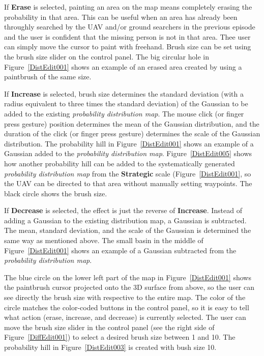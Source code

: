 If \textbf{Erase} is selected, painting an area on the map means completely erasing the probability in that area. This can be useful when an area has already been throughly searched by the UAV and/or ground searchers in the previous episode and the user is confident that the missing person is not in that area. Thee user can simply move the cursor to paint with freehand. Brush size can be set using the brush size slider on the control panel. The big circular hole in Figure~\ref{DistEdit001} shows an example of an erased area created by using a paintbrush of the same size.

If \textbf{Increase} is selected, brush size determines the standard deviation (with a radius equivalent to three times the standard deviation) of the Gaussian to be added to the existing \textit{probability distribution map}. The mouse click (or finger press gesture) position determines the mean of the Gaussian distribution, and the duration of the click (or finger press gesture) determines the scale of the Gaussian distribution. The probability hill in Figure~\ref{DistEdit001} shows an example of a Gaussian added to the \textit{probability distribution map}. Figure~\ref{DistEdit005} shows how another probability hill can be added to the systematically generated \textit{probability distribution map} from the \textbf{Strategic} scale (Figure~\ref{DistEdit001}, so the UAV can be directed to that area without manually setting waypoints. The black circle shows the brush size.

If \textbf{Decrease} is selected, the effect is just the reverse of \textbf{Increase}. Instead of adding a Gaussian to the existing distribution map, a Gaussian is subtracted. The mean, standard deviation, and the scale of the Gaussian is determined the same way as mentioned above. The small basin in the middle of Figure~\ref{DistEdit001} shows an example of a Gaussian subtracted from the \textit{probability distribution map}.

The blue circle on the lower left part of the map in Figure~\ref{DistEdit001} shows the paintbrush cursor projected onto the 3D surface from above, so the user can see directly the brush size with respective to the entire map. The color of the circle matches the color-coded buttons in the control panel, so it is easy to tell what action (erase, increase, and decrease) is currently selected. The user can move the brush size slider in the control panel (see the right side of Figure~\ref{DiffEdit001}) to select a desired brush size between 1 and 10. The probability hill in Figure~\ref{DistEdit003} is created with bush size 10.

